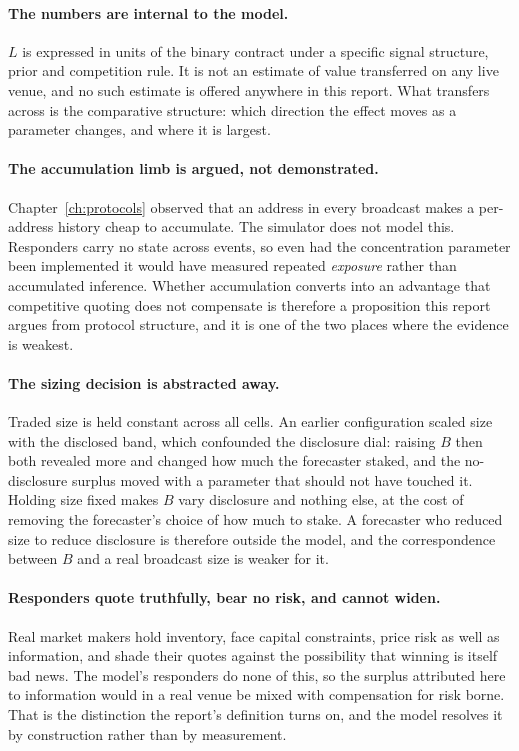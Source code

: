 \paragraph{The numbers are internal to the model.} $L$ is expressed in units of the binary
contract under a specific signal structure, prior and competition rule. It is not an estimate
of value transferred on any live venue, and no such estimate is offered anywhere in this
report. What transfers across is the comparative structure: which direction the effect moves
as a parameter changes, and where it is largest.

\paragraph{The accumulation limb is argued, not demonstrated.} Chapter~\ref{ch:protocols}
observed that an address in every broadcast makes a per-address history cheap to
accumulate. The simulator does not model this. Responders carry no state across events, so
even had the concentration parameter been implemented it would have measured repeated
\emph{exposure} rather than accumulated inference. Whether accumulation converts into an
advantage that competitive quoting does not compensate is therefore a proposition this
report argues from protocol structure, and it is one of the two places where the evidence is
weakest.

\paragraph{The sizing decision is abstracted away.} Traded size is held constant across all
cells. An earlier configuration scaled size with the disclosed band, which confounded the
disclosure dial: raising $B$ then both revealed more and changed how much the forecaster
staked, and the no-disclosure surplus moved with a parameter that should not have touched it.
Holding size fixed makes $B$ vary disclosure and nothing else, at the cost of removing the
forecaster's choice of how much to stake. A forecaster who reduced size to reduce disclosure
is therefore outside the model, and the correspondence between $B$ and a real broadcast size
is weaker for it.

\paragraph{Responders quote truthfully, bear no risk, and cannot widen.} Real market makers
hold inventory, face capital constraints, price risk as well as information, and shade their
quotes against the possibility that winning is itself bad news. The model's responders do
none of this, so the surplus attributed here to information would in a real venue be mixed
with compensation for risk borne. That is the distinction the report's definition turns on,
and the model resolves it by construction rather than by measurement.

